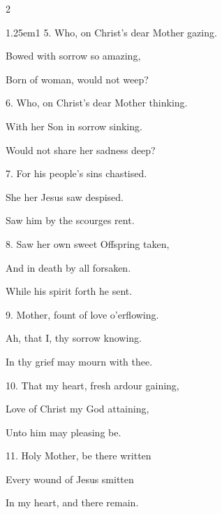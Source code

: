 \begin{multicols}{2}
\begin{hangparas}{1.25em}{1}
5. Who, on Christ's dear Mother gazing.

Bowed with sorrow so amazing,

Born of woman, would not weep?\\

\vspace{-0.5\baselineskip}

6. Who, on Christ's dear Mother thinking.

With her Son in sorrow sinking.

Would not share her sadness deep?\\

\vspace{-0.5\baselineskip}

7. For his people's sins chastised.

She her Jesus saw despised.

Saw him by the scourges rent.\\

\vspace{-0.5\baselineskip}

8. Saw her own sweet Offspring taken,

And in death by all forsaken.

While his spirit forth he sent.\\

\vspace{-0.5\baselineskip}

9. Mother, fount of love o'erflowing.

Ah, that I, thy sorrow knowing.

In thy grief may mourn with thee.\\

\vspace{-0.5\baselineskip}

10. That my heart, fresh ardour gaining,

Love of Christ my God attaining,

Unto him may pleasing be.\\

\vspace{-0.5\baselineskip}

11. Holy Mother, be there written

Every wound of Jesus smitten

In my heart, and there remain.\\


\end{hangparas}
\end{multicols}
